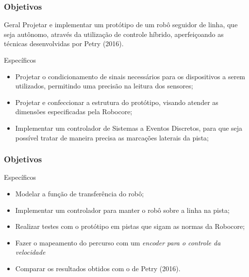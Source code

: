 \begin{frame}
\frametitle{Objetivos}
\begin{block}{Geral}
	 Projetar e implementar um protótipo de um robô seguidor de linha, que seja autônomo, através da utilização de controle híbrido, aperfeiçoando as técnicas desenvolvidas por Petry (2016).
\end{block}

\begin{block}{Específicos}
	\begin{itemize}
	\item Projetar o condicionamento de sinais necessários para os dispositivos a serem utilizados, permitindo uma precisão na leitura dos sensores;
	\item Projetar e confeccionar a estrutura do protótipo, visando atender as dimensões especificadas pela Robocore;
	\item Implementar um controlador de Sistemas a Eventos Discretos, para que seja possível tratar de maneira precisa as marcações laterais da pista;

	\end{itemize}
\end{block}

\end{frame}

\begin{frame}
\frametitle{Objetivos}
\begin{block}{Específicos}
	\begin{itemize}
	\item Modelar a função de transferência do robô;
	\item Implementar um controlador para manter o robô sobre a linha na pista;
	\item Realizar testes com o protótipo em pistas que sigam as normas da Robocore;
	\item Fazer o mapeamento do percurso com um \textit{encoder para o controle da velocidade}
	\item Comparar os resultados obtidos com o de Petry (2016).
	\end{itemize}
\end{block}

\end{frame}


